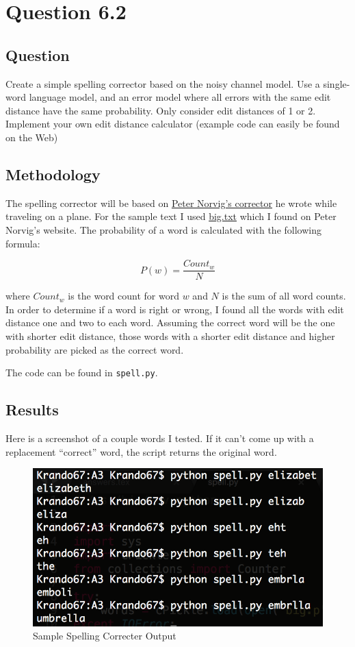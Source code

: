 \documentclass[10pt,letterpaper,bibliography=totoc]{scrartcl}
\begin{document}
\section{Question 6.2}
\subsection {Question}
Create a simple spelling corrector based on the noisy channel model. Use a single-word language model, and an error model where all errors with the same edit distance have the same probability. Only consider edit distances of 1 or 2. Implement your own edit distance calculator (example code can easily be found on the Web)

\subsection{Methodology}
The spelling corrector will be based on \href{http://norvig.com/spell-correct.html}{Peter Norvig's corrector} he wrote while traveling on a plane. For the sample text I used \href{http://norvig.com/big.txt}{big.txt} which I found on Peter Norvig's website. The probability of a word is calculated with the following formula:

\[P(w) = \frac{Count_w}{N}\]

where \(Count_w\) is the word count for word \(w\) and \(N\) is the sum of all word counts.\\

In order to determine if a word is right or wrong, I found all the words with edit distance one and two to each word. Assuming the correct word will be the one with shorter edit distance, those words with a shorter edit distance and higher probability are picked as the correct word. 

The code can be found in \texttt{spell.py}.

\subsection{Results}
Here is a screenshot of a couple words I tested. If it can't come up with a replacement ``correct'' word, the script returns the original word.
\begin{figure}[h!]
\centering
\label{fig:sample_spelling}
\includegraphics[scale=.5]{sample_spelling.png}
\caption{Sample Spelling Correcter Output}
\end{figure}
\end{document}
